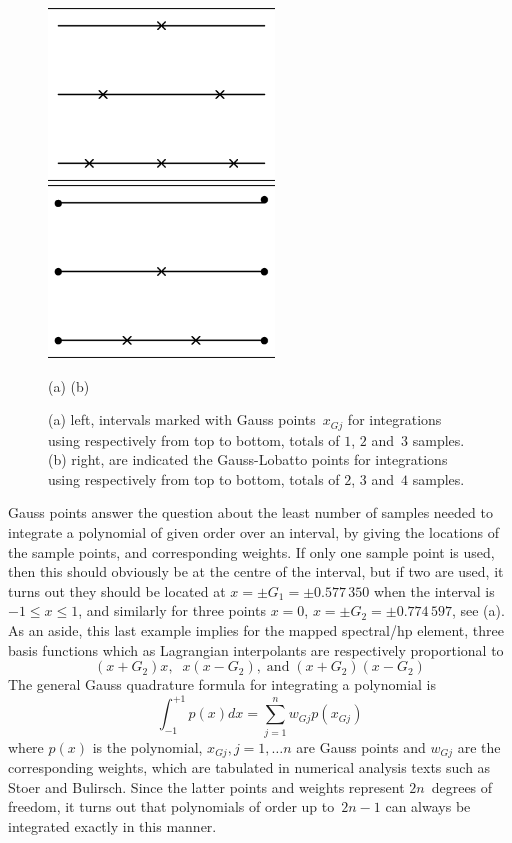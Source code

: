 \begin{figure}[h]
\centerline{\includegraphics[width=6cm]{../pics/gauxpts}
\includegraphics[width=6cm]{../pics/gaulob} }
\centerline{(a) \hspace{7cm} (b)}
\caption{(a) left, intervals marked with Gauss points~$x_{Gj}$
for integrations using respectively from top to bottom, totals of $1$, $2$ and~$3$ samples.
(b) right, are indicated the Gauss-Lobatto points 
for integrations using respectively from top to bottom, totals of $2$, $3$ and~$4$ samples.
\label{fig:gausspts}}
\end{figure}

Gauss points answer the question about the least number of samples
needed to integrate a polynomial of given order over an interval, by giving the
locations of the sample points, and corresponding weights. If only 
one sample point is used, then this should obviously be at the centre
of the interval, but if two are used, it turns out they should be
located at $x=\pm G_1 = \pm 0.577\,350$ when the interval is $-1 \leq x \leq 1$,
and similarly for three points $x=0$, $x=\pm G_2 = \pm 0.774\,597$,
see (a).
As an aside, this last example implies for the mapped spectral/hp element, three basis functions
which as Lagrangian interpolants are respectively proportional to
\begin{equation} \label{eq:lagpoly}
(x+G_2)x,\;\; x(x-G_2),\;\mbox{and}\; (x+G_2)(x-G_2)
\end{equation}
The general Gauss quadrature formula for integrating a polynomial is
\begin{equation} \label{eq:gaussint}
\int_{-1}^{+1} p(x) dx = \sum_{j=1}^{n} w_{Gj} p(x_{Gj}) 
\end{equation}
where $p(x)$ is the polynomial, $x_{Gj},j=1,\ldots n$ are Gauss points and
$w_{Gj}$ are the corresponding weights, which are tabulated in
numerical analysis texts such as Stoer and Bulirsch. %
Since the latter points and weights
represent $2n$~degrees of freedom, it turns out that polynomials of order
up to~$2n-1$ can always be integrated exactly in this manner.


